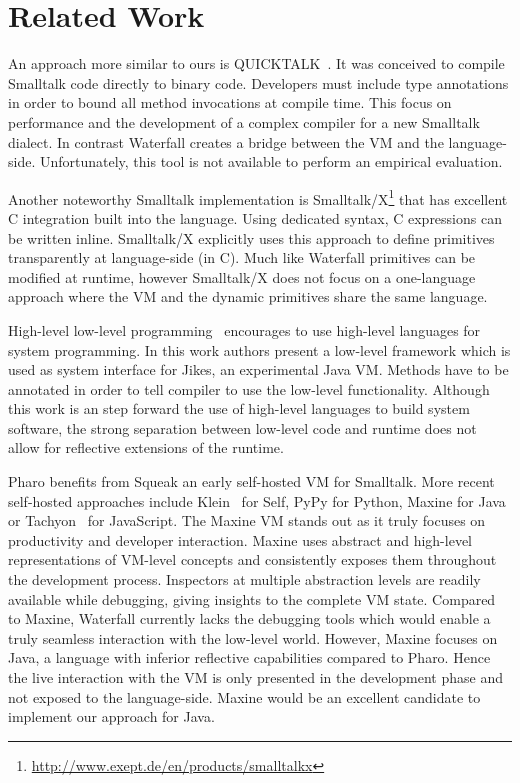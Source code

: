 \documentclass[10pt,preprint,letter]{sigplanconf}
\newcommand{\ST}  {Small\-talk\xspace}
\newcommand{\PH}  {Pharo\xspace}
\newcommand{\W}{Waterfall\xspace}
\begin{document}
\section{Related Work}
An approach more similar to ours is  QUICKTALK~\cite{Ball86a}. 
It was conceived to compile \ST code directly to binary code. Developers must include type annotations in order to bound all method invocations at compile time. 
This focus on performance and the development of a complex compiler for a new \ST dialect.
In contrast \W creates a bridge between the VM and the language-side. 
Unfortunately, this tool is not available to perform an empirical evaluation.
  


Another noteworthy \ST implementation is Smalltalk/X\footnote{\url{http://www.exept.de/en/products/smalltalkx}} that has excellent C integration built into the language.
Using dedicated syntax, C expressions can be written inline.
Smalltalk/X explicitly uses this approach to define primitives transparently at language-side (in C).
Much like \W primitives can be modified at runtime, however Smalltalk/X does not focus on a one-language approach where the VM and the dynamic primitives share the same language.

High-level low-level programming~\cite{Fram09a} encourages to use high-level languages for system programming.
In this work authors present a low-level framework which is used as system interface for Jikes, an experimental Java VM.  
Methods have to be annotated in order to tell compiler to use the low-level functionality. Although this work is an step forward the use of high-level languages to build system software, the strong separation between low-level code and runtime does not allow for reflective extensions of the runtime.







\PH benefits from Squeak\cite{Inga97a} an early self-hosted VM for \ST.
More recent self-hosted approaches include Klein~\cite{Unga05a} for Self, PyPy \cite{Rigo06a} for Python, Maxine \cite{Wimm13a} for Java or Tachyon~\cite{Chev11a} for JavaScript.
The Maxine VM stands out as it truly focuses on productivity and developer interaction.
Maxine uses abstract and high-level representations of VM-level concepts and consistently exposes them throughout the development process.
Inspectors at multiple abstraction levels are readily available while debugging, giving insights to the complete VM state.
Compared to Maxine, \W currently lacks the debugging tools which would enable a truly seamless interaction with the low-level world.
However, Maxine focuses on Java, a language with inferior reflective capabilities compared to \PH.
Hence the live interaction with the VM is only presented in the development phase and not exposed to the language-side.
Maxine would be an excellent candidate to implement our approach for Java.
\end{document}
